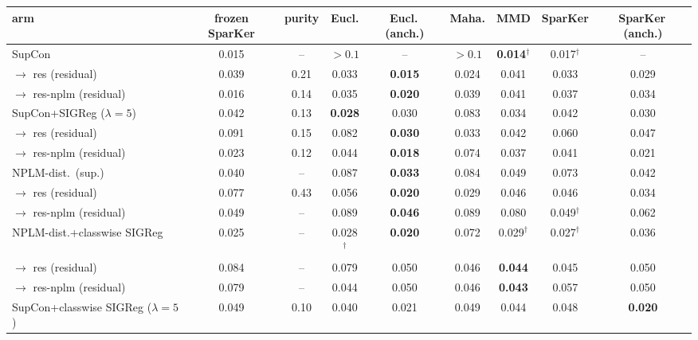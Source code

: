 \begin{table}[t]
\centering
\footnotesize
\begin{tabular}{lcccccccc}
\toprule
arm & frozen SparKer & purity & Eucl. & Eucl.\,(anch.) & Maha. & MMD & SparKer & SparKer\,(anch.) \\
\midrule
SupCon & 0.015 & -- & $>0.1$ & -- & $>0.1$ & \textbf{0.014$^\dagger$} & 0.017$^\dagger$ & -- \\
\quad $\to$ res (residual) & 0.039 & 0.21 & 0.033 & \textbf{0.015} & 0.024 & 0.041 & 0.033 & 0.029 \\
\quad $\to$ res-nplm (residual) & 0.016 & 0.14 & 0.035 & \textbf{0.020} & 0.039 & 0.041 & 0.037 & 0.034 \\
\addlinespace
SupCon+SIGReg ($\lambda{=}5$) & 0.042 & 0.13 & \textbf{0.028} & 0.030 & 0.083 & 0.034 & 0.042 & 0.030 \\
\quad $\to$ res (residual) & 0.091 & 0.15 & 0.082 & \textbf{0.030} & 0.033 & 0.042 & 0.060 & 0.047 \\
\quad $\to$ res-nplm (residual) & 0.023 & 0.12 & 0.044 & \textbf{0.018} & 0.074 & 0.037 & 0.041 & 0.021 \\
\addlinespace
NPLM-dist.\ (sup.) & 0.040 & -- & 0.087 & \textbf{0.033} & 0.084 & 0.049 & 0.073 & 0.042 \\
\quad $\to$ res (residual) & 0.077 & 0.43 & 0.056 & \textbf{0.020} & 0.029 & 0.046 & 0.046 & 0.034 \\
\quad $\to$ res-nplm (residual) & 0.049 & -- & 0.089 & \textbf{0.046} & 0.089 & 0.080 & 0.049$^\dagger$ & 0.062 \\
\addlinespace
NPLM-dist.+classwise SIGReg & 0.025 & -- & 0.028$^\dagger$ & \textbf{0.020} & 0.072 & 0.029$^\dagger$ & 0.027$^\dagger$ & 0.036 \\
\quad $\to$ res (residual) & 0.084 & -- & 0.079 & 0.050 & 0.046 & \textbf{0.044} & 0.045 & 0.050 \\
\quad $\to$ res-nplm (residual) & 0.079 & -- & 0.044 & 0.050 & 0.046 & \textbf{0.043} & 0.057 & 0.050 \\
\addlinespace
SupCon+classwise SIGReg ($\lambda{=}5$) & 0.049 & 0.10 & 0.040 & 0.021 & 0.049 & 0.044 & 0.048 & \textbf{0.020} \\

\end{tabular}
\end{table}
